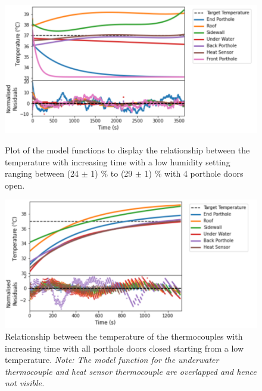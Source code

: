 \documentclass{article}
\begin{document}
\begin{figure}[H]
\centering
\begin{minipage}{.48\linewidth}
    \captionsetup{justification=centering,margin=0.5cm}
    \includegraphics[width=\textwidth]{4 doors open low humidity.png}
    \caption{Plot of the model functions to display the relationship between the temperature with increasing time with a low humidity setting ranging between (24 $\pm$ 1) $\%$ to (29 $\pm$ 1) $\%$ with 4 porthole doors open.}
\end{minipage}
\hfill
\begin{minipage}{.48\linewidth}
    \captionsetup{justification=centering}
    \includegraphics[width=\textwidth]{temperature increasing.png}
    \caption{Relationship between the temperature of the thermocouples with increasing time with all porthole doors closed starting from a low temperature. \textit{Note: The model function for the underwater thermocouple and heat sensor thermocouple are overlapped and hence not visible.}}
    \end{minipage}
\end{figure}
\end{document}
